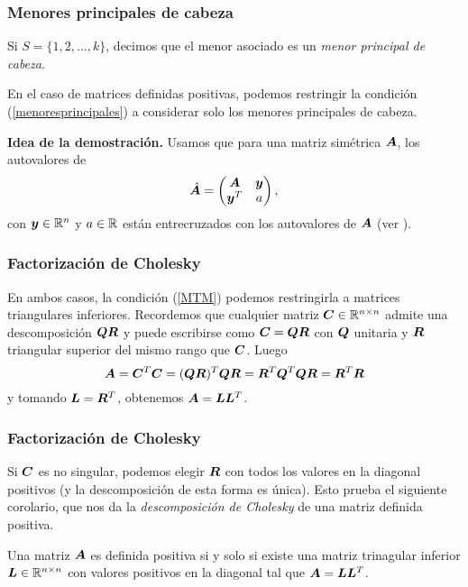 \documentclass[aspectratio=169,12pt,spanish]{beamer}
\begin{document}

\begin{frame}
\frametitle{Menores principales de cabeza}

Si $S = \{1, 2, \dots, k\}$, decimos que el menor asociado es un \emph{menor principal de cabeza}.

En el caso de matrices definidas positivas, podemos restringir la condición (\ref{menoresprincipales}) a considerar solo los menores principales de cabeza.

\textbf{Idea de la demostración.} Usamos que para una matriz simétrica $\bm{A}$, los autovalores de 
$$
\hat {\bm{A}} = \begin{pmatrix} 
\bm{A} & \bm{y} \\
\bm{y}^T & a 
\end{pmatrix},$$
con $\bm{y} \in \mathbb{R}^n$ y $a \in \mathbb{R}$ están entrecruzados con los autovalores de $\bm{A}$ (ver \cite[Teorema 4.3.8]{Horn1985}).


\end{frame}


\begin{frame}
\frametitle{Factorización de Cholesky}

En ambos casos, la condición (\ref{MTM}) podemos restringirla a matrices triangulares inferiores. Recordemos que cualquier matriz $\bm{C} \in \mathbb{R}^{n\times n}$ admite una descomposición $\bm{Q}\bm{R}$ y puede escribirse como $\bm{C} = \bm{Q} \bm{R}$ con $\bm{Q}$ unitaria y $\bm{R}$ triangular superior del mismo rango que $\bm{C}$. Luego
$$
\bm{A} = \bm{C}^T \bm{C} = (\bm{Q} \bm{R})^T \bm{Q} \bm{R} = \bm{R}^T \bm{Q}^T \bm{Q} \bm{R} = \bm{R}^T \bm{R}
$$
y tomando $\bm{L} = \bm{R}^T$, obtenemos $\bm{A} = \bm{L} \bm{L}^T$.

\end{frame}


\begin{frame}
\frametitle{Factorización de Cholesky}


Si $\bm{C}$ es no singular, podemos elegir $\bm{R}$ con todos los valores en la diagonal positivos (y la descomposición de esta forma es única).
Esto prueba el siguiente corolario, que nos da la \emph{descomposición de Cholesky} de una matriz definida positiva.

\begin{corollary}
Una matriz $\bm{A}$ es definida positiva si y solo si existe una matriz trinagular inferior $\bm{L} \in \mathbb{R}^{n\times n}$ con valores positivos en la diagonal tal que $\bm{A} = \bm{L} \bm{L}^T$.
\end{corollary}



\end{frame}
\end{document}
